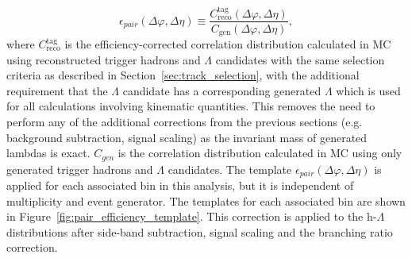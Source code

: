 %
\begin{equation}
    \epsilon_{pair}(\Delta\varphi, \Delta\eta) \equiv \frac{C_{\text{reco}}^{\text{tag}}(\Delta\varphi, \Delta\eta)}{C_{\text{gen}}(\Delta\varphi, \Delta\eta)},
\label{eq:paircorr}
\end{equation}
%
where $C_{\text{reco}}^{\text{tag}}$ is the efficiency-corrected correlation distribution calculated in MC using reconstructed trigger hadrons and $\Lambda$ candidates with the same selection criteria as described in Section~\ref{sec:track_selection}, with the additional requirement that the $\Lambda$ candidate has a corresponding generated $\Lambda$ which is used for all calculations involving kinematic quantities. This removes the need to perform any of the additional corrections from the previous sections (e.g. background subtraction, signal scaling) as the invariant mass of generated lambdas is exact. $C_{gen}$ is the correlation distribution calculated in MC using only generated trigger hadrons and $\Lambda$ candidates. The template $\epsilon_{pair}(\Delta\varphi, \Delta\eta)$ is applied for each associated \pt bin in this analysis, but it is independent of multiplicity and event generator. The templates for each associated \pt bin are shown in Figure~\ref{fig:pair_efficiency_template}. This correction is applied to the h-$\Lambda$ distributions after side-band subtraction, signal scaling and the branching ratio correction.

